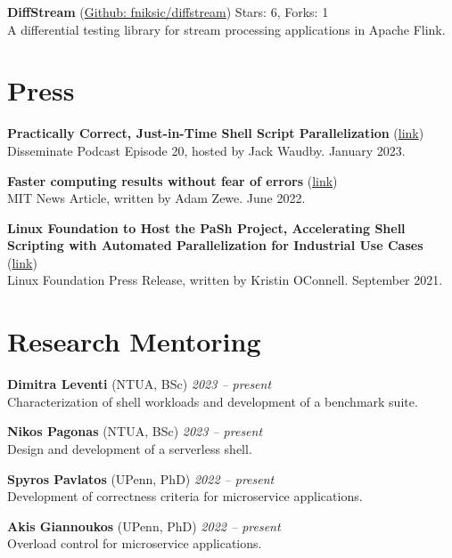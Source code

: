 \documentclass[margin]{res}
\begin{document}
\begin{resume}
\textbf{DiffStream} (\href{https://github.com/fniksic/diffstream}{Github: fniksic/diffstream}) Stars: 6, Forks: 1 \\
A differential testing library for stream processing applications in Apache Flink.

\section{Press}

\textbf{Practically Correct, Just-in-Time Shell Script Parallelization} (\href{https://disseminatepodcast.podcastpage.io/episode/konstantinos-kallas-practically-correct-just-in-time-shell-script-parallelization-20}{link}) \\
Disseminate Podcast Episode 20, hosted by Jack Waudby. January 2023.

\textbf{Faster computing results without fear of errors} (\href{https://news.mit.edu/2022/faster-unix-computing-program-0607}{link}) \\
MIT News Article, written by Adam Zewe. June 2022.

\textbf{Linux Foundation to Host the PaSh Project, Accelerating Shell Scripting with Automated Parallelization for Industrial Use Cases} (\href{https://www.linuxfoundation.org/press/press-release/linux-foundation-to-host-the-pash-project-accelerating-shell-scripting-with-automated-parallelization-for-industrial-use-cases}{link}) \\
Linux Foundation Press Release, written by Kristin OConnell. September 2021.


\section{Research Mentoring}

\textbf{Dimitra Leventi} (NTUA, BSc) \hfill {\em 2023 -- present} \\
Characterization of shell workloads and development of a benchmark suite.

\textbf{Nikos Pagonas} (NTUA, BSc) \hfill {\em 2023 -- present} \\
Design and development of a serverless shell.

\textbf{Spyros Pavlatos} (UPenn, PhD) \hfill {\em 2022 -- present} \\
Development of correctness criteria for microservice applications.

\textbf{Akis Giannoukos} (UPenn, PhD) \hfill {\em 2022 -- present} \\
Overload control for microservice applications.


\end{resume}
\end{document}
